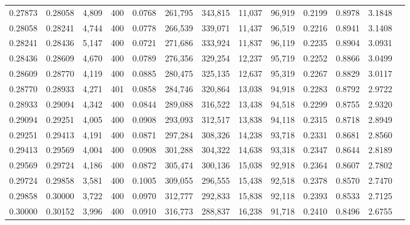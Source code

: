 \begin{tabular}{rrrrrrrrrrrrr}
0.27873 & 0.28058 &  4,809 &   400 &                                     0.0768 & 261,795 & 343,815 &  11,037 &  96,919 & 0.2199 & 0.8978 & 3.1848 \\
0.28058 & 0.28241 &  4,744 &   400 &                                     0.0778 & 266,539 & 339,071 &  11,437 &  96,519 & 0.2216 & 0.8941 & 3.1408 \\
0.28241 & 0.28436 &  5,147 &   400 &                                     0.0721 & 271,686 & 333,924 &  11,837 &  96,119 & 0.2235 & 0.8904 & 3.0931 \\
0.28436 & 0.28609 &  4,670 &   400 &                                     0.0789 & 276,356 & 329,254 &  12,237 &  95,719 & 0.2252 & 0.8866 & 3.0499 \\
0.28609 & 0.28770 &  4,119 &   400 &                                     0.0885 & 280,475 & 325,135 &  12,637 &  95,319 & 0.2267 & 0.8829 & 3.0117 \\
0.28770 & 0.28933 &  4,271 &   401 &                                     0.0858 & 284,746 & 320,864 &  13,038 &  94,918 & 0.2283 & 0.8792 & 2.9722 \\
0.28933 & 0.29094 &  4,342 &   400 &                                     0.0844 & 289,088 & 316,522 &  13,438 &  94,518 & 0.2299 & 0.8755 & 2.9320 \\
0.29094 & 0.29251 &  4,005 &   400 &                                     0.0908 & 293,093 & 312,517 &  13,838 &  94,118 & 0.2315 & 0.8718 & 2.8949 \\
0.29251 & 0.29413 &  4,191 &   400 &                                     0.0871 & 297,284 & 308,326 &  14,238 &  93,718 & 0.2331 & 0.8681 & 2.8560 \\
0.29413 & 0.29569 &  4,004 &   400 &                                     0.0908 & 301,288 & 304,322 &  14,638 &  93,318 & 0.2347 & 0.8644 & 2.8189 \\
0.29569 & 0.29724 &  4,186 &   400 &                                     0.0872 & 305,474 & 300,136 &  15,038 &  92,918 & 0.2364 & 0.8607 & 2.7802 \\
0.29724 & 0.29858 &  3,581 &   400 &                                     0.1005 & 309,055 & 296,555 &  15,438 &  92,518 & 0.2378 & 0.8570 & 2.7470 \\
0.29858 & 0.30000 &  3,722 &   400 &                                     0.0970 & 312,777 & 292,833 &  15,838 &  92,118 & 0.2393 & 0.8533 & 2.7125 \\
0.30000 & 0.30152 &  3,996 &   400 &                                     0.0910 & 316,773 & 288,837 &  16,238 &  91,718 & 0.2410 & 0.8496 & 2.6755 \\

\end{tabular}
